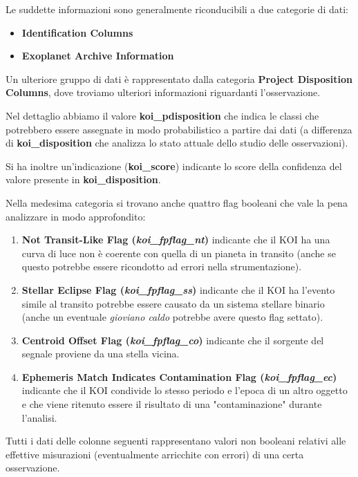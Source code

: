 Le suddette informazioni sono generalmente riconducibili a due categorie di dati:
\begin{itemize}
    \item \textbf{Identification Columns}
    \item \textbf{Exoplanet Archive Information}
\end{itemize}

Un ulteriore gruppo di dati è rappresentato dalla categoria 
\textbf{Project Disposition Columns}, dove troviamo ulteriori informazioni 
riguardanti l'osservazione.

Nel dettaglio abbiamo il valore \textbf{koi\_pdisposition} che indica le classi 
che potrebbero essere assegnate in modo probabilistico a partire dai dati 
(a differenza di \textbf{koi\_disposition} che analizza lo stato attuale 
dello studio delle osservazioni).

Si ha inoltre un'indicazione (\textbf{koi\_score}) indicante lo score della 
confidenza del valore presente in \textbf{koi\_disposition}.

Nella medesima categoria si trovano anche quattro flag booleani che vale la 
pena analizzare in modo approfondito:
\begin{enumerate}
    \item \textbf{Not Transit-Like Flag (\textit{koi\_fpflag\_nt})} indicante
    che il KOI ha una curva di luce non è coerente con quella di un pianeta in 
    transito (anche se questo potrebbe essere ricondotto ad errori nella 
    strumentazione).
    \item \textbf{Stellar Eclipse Flag (\textit{koi\_fpflag\_ss})} indicante
    che il KOI ha l'evento simile al transito potrebbe essere causato da un 
    sistema stellare binario (anche un eventuale \textit{gioviano caldo} 
    potrebbe avere questo flag settato).
    \item \textbf{Centroid Offset Flag (\textit{koi\_fpflag\_co})} indicante
    che il sorgente del segnale proviene da una stella vicina.
    \item \textbf{Ephemeris Match Indicates Contamination Flag
    (\textit{koi\_fpflag\_ec})} indicante che il KOI condivide lo stesso periodo
    e l'epoca di un altro oggetto e che viene ritenuto essere il risultato di
    una "contaminazione" durante l'analisi.
\end{enumerate}

Tutti i dati delle colonne seguenti rappresentano valori non booleani relativi
alle effettive misurazioni (eventualmente arricchite con errori) di una 
certa osservazione. 

